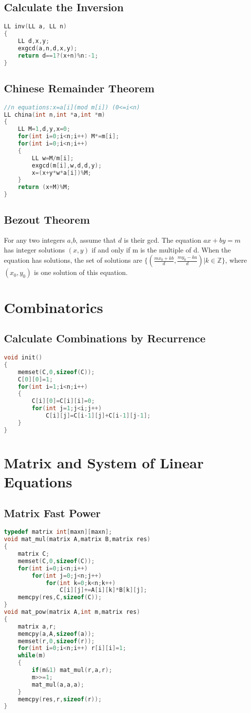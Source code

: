   \subsection{Calculate the Inversion}
  \begin{lstlisting}[language=C++]
LL inv(LL a, LL n)
{
	LL d,x,y;
	exgcd(a,n,d,x,y);
	return d==1?(x+n)%n:-1;
}
  \end{lstlisting}
  \subsection{Chinese Remainder Theorem}
  \begin{lstlisting}[language=C++]
//n equations:x=a[i](mod m[i]) (0<=i<n)
LL china(int n,int *a,int *m)
{
	LL M=1,d,y,x=0;
	for(int i=0;i<n;i++) M*=m[i];
	for(int i=0;i<n;i++)
	{
		LL w=M/m[i];
		exgcd(m[i],w,d,d,y);
		x=(x+y*w*a[i])%M;
	}
	return (x+M)%M;
}
  \end{lstlisting}
  \subsection{Bezout Theorem}
For any two integers $a$,$b$, assume that $d$ is their gcd. The equation $ax+by=m$ has integer solutions $(x,y)$ if and only if m is the multiple of d. When the equation has solutions, the set of solutions are $\{(\frac{mx_0+kb}{d},\frac{my_0-ka}{d})|k \in \mathbb{Z} \}$, where $(x_0,y_0)$ is one solution of this equation. 
 \section{Combinatorics}
  \subsection{Calculate Combinations by Recurrence}
  \begin{lstlisting}[language=C++]
void init()
{
    memset(C,0,sizeof(C));
    C[0][0]=1;
    for(int i=1;i<n;i++)
    {
        C[i][0]=C[i][i]=0;
        for(int j=1;j<i;j++)
            C[i][j]=C[i-1][j]+C[i-1][j-1];
    }
}
  \end{lstlisting}
 \section{Matrix and System of Linear Equations}
  \subsection{Matrix Fast Power}
  \begin{lstlisting}[language=C++]
typedef matrix int[maxn][maxn];
void mat_mul(matrix A,matrix B,matrix res)
{
    matrix C;
    memset(C,0,sizeof(C));
    for(int i=0;i<n;i++)
        for(int j=0;j<n;j++)
            for(int k=0;k<n;k++)
                C[i][j]+=A[i][k]*B[k][j];
    memcpy(res,C,sizeof(C));
}
void mat_pow(matrix A,int m,matrix res)
{
    matrix a,r;
    memcpy(a,A,sizeof(a));
    memset(r,0,sizeof(r));
    for(int i=0;i<n;i++) r[i][i]=1;
    while(m)
    {
        if(m&1) mat_mul(r,a,r);
        m>>=1;
        mat_mul(a,a,a);
    }
    memcpy(res,r,sizeof(r));
}
  \end{lstlisting}
